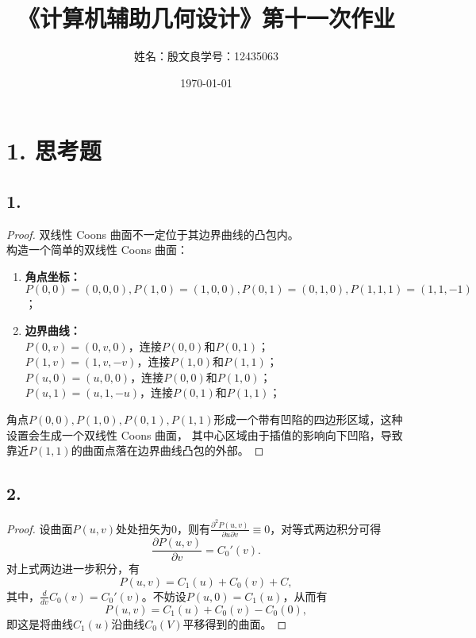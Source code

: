 \documentclass[utf8]{ctexart}
\title{《计算机辅助几何设计》第十一次作业}
\author{姓名：殷文良\qquad 学号：12435063}
\date{\today}
\begin{document}
\maketitle
{}

\section*{1. 思考题}
\subsection*{1.}
\begin{proof}
    双线性 Coons 曲面不一定位于其边界曲线的凸包内。\\
    构造一个简单的双线性 Coons 曲面：
    \begin{enumerate}
        \item \textbf{角点坐标：}\\
        $P(0,0) = (0,0,0), P(1, 0) = (1, 0, 0), P(0, 1) = (0, 1, 0), P(1, 1, 1) = (1, 1, -1)$；
        \item \textbf{边界曲线：}\\
        $P(0, v) = (0, v, 0)$，连接$P(0, 0)$和$P(0, 1)$；\\
        $P(1, v) = (1, v, -v)$，连接$P(1, 0)$和$P(1, 1)$；\\
        $P(u, 0) = (u, 0, 0)$，连接$P(0, 0)$和$P(1, 0)$；\\
        $P(u, 1) = (u, 1, -u)$，连接$P(0, 1)$和$P(1, 1)$；
    \end{enumerate}
    角点$P(0,0),P(1,0),P(0,1),P(1,1)$形成一个带有凹陷的四边形区域，这种设置会生成一个双线性 Coons 曲面，
    其中心区域由于插值的影响向下凹陷，导致靠近$P(1,1)$的曲面点落在边界曲线凸包的外部。
\end{proof}

\subsection*{2.}
\begin{proof}
    设曲面$P(u,v)$处处扭矢为0，则有$\frac{\partial^2 P(u,v)}{\partial u\partial v}\equiv 0$，对等式两边积分可得
    $$
    \frac{\partial P(u,v)}{\partial v} = C_0'(v).
    $$
    对上式两边进一步积分，有
    $$
    P(u,v) = C_1(u) + C_0(v) + C,
    $$
    其中，$\frac{d}{dv}C_0(v) = C_0'(v)$。不妨设$P(u,0) = C_1(u)$，从而有
    $$
    P(u,v) = C_1(u) + C_0(v) - C_0(0),
    $$
    即这是将曲线$C_1(u)$沿曲线$C_0(V)$平移得到的曲面。
\end{proof}
\end{document}

